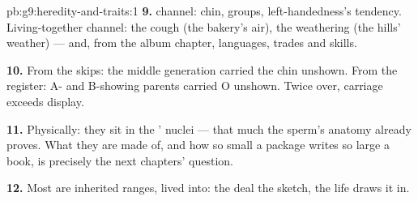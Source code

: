 \begin{solution}{pb:g9:heredity-and-traits:1}
\textbf{9.}  channel: chin,  groups,
left-handedness's tendency. Living-together channel: the
cough (the bakery's air), the weathering (the hills'
weather) --- and, from the album chapter, languages,
trades and skills.

\textbf{10.} From the skips: the middle generation
carried the chin unshown. From the  register: A- and
B-showing parents carried O unshown. Twice over, carriage
exceeds display.

\textbf{11.} Physically: they sit in the ' nuclei
--- that much the sperm's anatomy already proves. What
they are made of, and how so small a package writes so
large a book, is precisely the next chapters' question.

\textbf{12.} Most  are inherited ranges, lived
into: the  deal the sketch, the life draws it in.
\end{solution}
